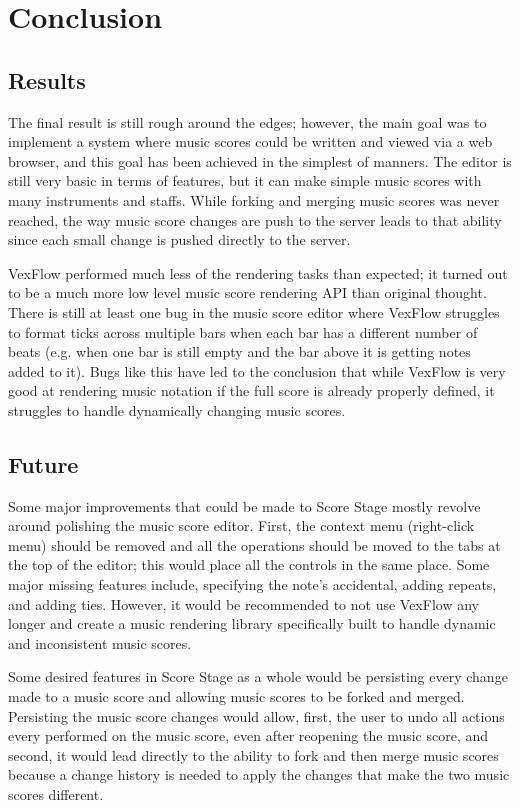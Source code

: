 \documentclass[letterpaper,12pt]{article}
\begin{document}
\section{Conclusion}

\subsection{Results}

The final result is still rough around the edges; however, the main goal was to implement a system where music scores
could be written and viewed via a web browser, and this goal has been achieved in the simplest of manners. The editor
is still very basic in terms of features, but it can make simple music scores with many instruments and staffs. While
forking and merging music scores was never reached, the way music score changes are push to the server leads to that
ability since each small change is pushed directly to the server.

VexFlow performed much less of the rendering tasks than expected; it turned out to be a much more low level music score
rendering API than original thought. There is still at least one bug in the music score editor where VexFlow
struggles to format ticks across multiple bars when each bar has a different number of beats (e.g. when one bar is still
empty and the bar above it is getting notes added to it). Bugs like this have led to the conclusion that while VexFlow
is very good at rendering music notation if the full score is already properly defined, it struggles to handle
dynamically changing music scores.

\subsection{Future}

Some major improvements that could be made to Score Stage mostly revolve around polishing the music score editor. First,
the context menu (right-click menu) should be removed and all the operations should be moved to the tabs at the top of
the editor; this would place all the controls in the same place. Some major missing features include, specifying the
note's accidental, adding repeats, and adding ties. However, it would be recommended to not use VexFlow any longer and
create a music rendering library specifically built to handle dynamic and inconsistent music scores.

Some desired features in Score Stage as a whole would be persisting every change made to a music score and allowing
music scores to be forked and merged. Persisting the music score changes would allow, first, the user to undo all
actions every performed on the music score, even after reopening the music score, and second, it would lead directly to
the ability to fork and then merge music scores because a change history is needed to apply the changes that make the
two music scores different.
\end{document}
